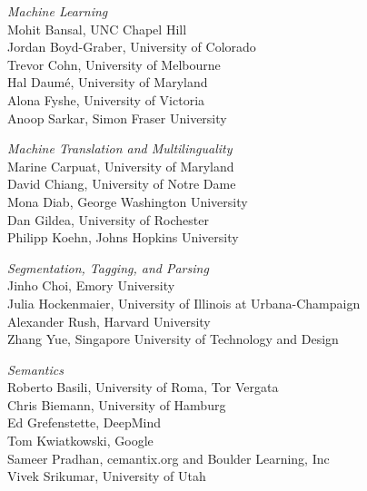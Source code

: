\documentclass[11pt]{article}
\begin{document}
\emph{Machine Learning} \\
\hspace*{0.2in} Mohit Bansal, UNC Chapel Hill \\
\hspace*{0.2in} Jordan Boyd-Graber, University of Colorado \\
\hspace*{0.2in} Trevor Cohn, University of Melbourne\\
\hspace*{0.2in} Hal Daumé, University of Maryland \\
\hspace*{0.2in} Alona Fyshe, University of Victoria \\
\hspace*{0.2in} Anoop Sarkar, Simon Fraser University


\emph{Machine Translation and Multilinguality} \\
\hspace*{0.2in} Marine Carpuat, University of Maryland \\
\hspace*{0.2in} David Chiang, University of Notre Dame \\
\hspace*{0.2in} Mona Diab, George Washington University \\
\hspace*{0.2in} Dan Gildea, University of Rochester \\
\hspace*{0.2in} Philipp Koehn, Johns Hopkins University


\emph{Segmentation, Tagging, and Parsing} \\
\hspace*{0.2in} Jinho Choi, Emory University \\
\hspace*{0.2in} Julia Hockenmaier, University of Illinois at Urbana-Champaign \\
\hspace*{0.2in} Alexander Rush, Harvard University \\
\hspace*{0.2in} Zhang Yue, Singapore University of Technology and Design


\emph{Semantics} \\
\hspace*{0.2in} Roberto Basili, University of Roma, Tor Vergata \\
\hspace*{0.2in} Chris Biemann, University of Hamburg \\
\hspace*{0.2in} Ed Grefenstette, DeepMind \\
\hspace*{0.2in} Tom Kwiatkowski, Google \\
\hspace*{0.2in} Sameer Pradhan, cemantix.org and Boulder Learning, Inc \\
\hspace*{0.2in} Vivek Srikumar, University of Utah
\end{document}
